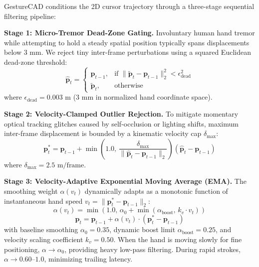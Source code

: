 GestureCAD conditions the 2D cursor trajectory through a three-stage sequential filtering pipeline:

\textbf{Stage 1: Micro-Tremor Dead-Zone Gating.} Involuntary human hand tremor while attempting to hold a steady spatial position typically spans displacements below $3\text{ mm}$. We reject tiny inter-frame perturbations using a squared Euclidean dead-zone threshold:
\begin{equation}
\hat{\mathbf{p}}_t = \begin{cases}
\mathbf{p}_{t-1}, & \text{if } \|\tilde{\mathbf{p}}_t - \mathbf{p}_{t-1}\|_2^2 < \epsilon_{\text{dead}}^2 \\
\tilde{\mathbf{p}}_t, & \text{otherwise}
\end{cases}
\label{eq:deadzone}
\end{equation}
where $\epsilon_{\text{dead}} = 0.003\text{ m}$ ($3\text{ mm}$ in normalized hand coordinate space).

\textbf{Stage 2: Velocity-Clamped Outlier Rejection.} To mitigate momentary optical tracking glitches caused by self-occlusion or lighting shifts, maximum inter-frame displacement is bounded by a kinematic velocity cap $\delta_{\max}$:
\begin{equation}
\mathbf{p}^*_t = \mathbf{p}_{t-1} + \min\left(1.0, \, \frac{\delta_{\max}}{\|\hat{\mathbf{p}}_t - \mathbf{p}_{t-1}\|_2}\right) (\hat{\mathbf{p}}_t - \mathbf{p}_{t-1})
\label{eq:velocity_clamp}
\end{equation}
where $\delta_{\max} = 2.5\text{ m/frame}$.

\textbf{Stage 3: Velocity-Adaptive Exponential Moving Average (EMA).} The smoothing weight $\alpha(v_t)$ dynamically adapts as a monotonic function of instantaneous hand speed $v_t = \|\mathbf{p}^*_t - \mathbf{p}_{t-1}\|_2$:
\begin{equation}
\alpha(v_t) = \min\left(1.0, \, \alpha_0 + \min\left(\alpha_{\text{boost}}, \, k_v \cdot v_t\right)\right)
\label{eq:adaptive_alpha}
\end{equation}
\begin{equation}
\mathbf{p}_t = \mathbf{p}_{t-1} + \alpha(v_t) \cdot (\mathbf{p}^*_t - \mathbf{p}_{t-1})
\label{eq:ema}
\end{equation}
with baseline smoothing $\alpha_0 = 0.35$, dynamic boost limit $\alpha_{\text{boost}} = 0.25$, and velocity scaling coefficient $k_v = 0.50$. When the hand is moving slowly for fine positioning, $\alpha \to \alpha_0$, providing heavy low-pass filtering. During rapid strokes, $\alpha \to 0.60$--$1.0$, minimizing trailing latency.

